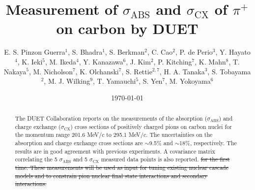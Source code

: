 \documentclass[%
 reprint,
showpacs,
 amsmath,amssymb,
 aps,
 prc,
]{revtex4-1}
\begin{document}
\title{Measurement of $\sigma_{\mathrm{ABS}}$ and $\sigma_{\mathrm{CX}}$ of $\pi^+$ on carbon by DUET}%

\author{E. S. Pinzon Guerra$^1$, S. Bhadra$^1$, S. Berkman$^2$, C. Cao$^2$, P. de Perio$^3$, Y. Hayato$^4$, K. Ieki$^5$, M. Ikeda$^4$, Y. Kanazawa$^6$,  J. Kim$^2$, P. Kitching$^7$, K. Mahn$^8$, T. Nakaya$^5$,  M. Nicholson$^7$, K. Olchanski$^7$, S. Rettie$^{2,7}$, H. A. Tanaka$^3$, S. Tobayama$^2$, M. J. Wilking$^9$, T. Yamauchi$^5$, S. Yen$^7$, M. Yokoyama$^6$}

%


\date{\today}%

\begin{abstract}

The DUET Collaboration reports on the measurements of the absorption ($\sigma_{\mathrm{ABS}}$) and charge exchange ($\sigma_{\mathrm{CX}}$) cross sections of positively charged pions on carbon nuclei for the momentum range 201.6 MeV$/c$ to 295.1 MeV$/c$. The uncertainties on the absorption and charge exchange cross sections are $\sim$9.5\% and $\sim$18\%, respectively. The results are in good agreement with previous experiments. A covariance {\color{red} matrix} correlating the 5 $\sigma_{\mathrm{ABS}}$ and 5 $\sigma_{\mathrm{CX}}$ measured data points is also reported. \st{for the first time. These measurements will be used as input for tuning existing nuclear cascade models and to constrain pion nuclear final state interactions and secondary interactions.}

\end{abstract}
\end{document}
